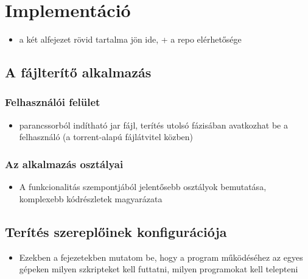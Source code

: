 \chapter{Implementáció}
\label{chp:implementation}
\begin{itemize}
  \item a két alfejezet rövid tartalma jön ide, + a repo elérhetősége
\end{itemize}

\section{A fájlterítő alkalmazás}

%
\subsection{Felhasználói felület}
%
\begin{itemize}
  \item parancssorból indítható jar fájl, terítés utolsó fázisában avatkozhat be a felhasználó (a torrent-alapú fájlátvitel közben)
\end{itemize}

%
\subsection{Az alkalmazás osztályai}
%



\begin{itemize}
  \item A funkcionalitás szempontjából jelentősebb osztályok bemutatása, komplexebb kódrészletek magyarázata
\end{itemize}

\section{Terítés szereplőinek konfigurációja}

\begin{itemize}
  \item Ezekben a fejezetekben mutatom be, hogy a program működéséhez az egyes gépeken milyen szkripteket kell futtatni, milyen programokat kell telepteni
\end{itemize}


